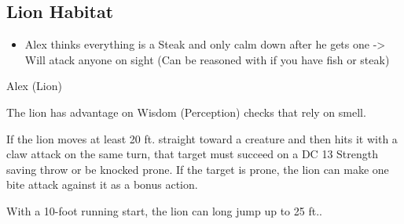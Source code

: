 \subsection*{ Lion Habitat}
\begin{itemize}
	\item Alex thinks everything is a Steak and only calm down after he gets one -> Will atack anyone on sight (Can be reasoned with if you have fish or steak)
\end{itemize}
\begin{DndMonster}[width=0.5\textwidth]{Alex (Lion)}

	\DndMonsterBasics[
		armor-class = {15 (Natural Armor)},
		hit-points  = {\DndDice{8d10 + 8}},
		speed       = {50 ft.},
	]

	\renewcommand{\AbilityScoreSpacer}{~}

	\DndMonsterAbilityScores[
		str = 17,
		dex = 15,
		con = 13,
		int = 3,
		wis = 12,
		cha = 8,
	]

	\DndMonsterDetails[
		skills = {Perception +3, Stealth +6},
		senses = {passive Perception 13},
		languages = {Common},
		challenge = 3,
	]

	The lion has advantage on Wisdom (Perception) checks that rely on smell.
	
	If the lion moves at least 20 ft. straight toward a creature and then hits it with a claw attack on the same turn, that target must succeed on a DC 13 Strength saving throw or be knocked prone. If the target is prone, the lion can make one bite attack against it as a bonus action.
	
	With a 10-foot running start, the lion can long jump up to 25 ft..
	

	\DndMonsterAttack[
		name=Bite,
		distance=melee, %
		mod=+5,
		reach=5,
		targets=one target,
		dmg={\DndDice{1d8 + 3}},
		dmg-type=piercing,
	]
	
	\DndMonsterAttack[
		name=Claw,
		distance=melee, %
		mod=+8,
		reach=5,
		targets=one target,
		dmg={\DndDice{1d6 + 3}},
		dmg-type=slashing,
	]
\end{DndMonster}
